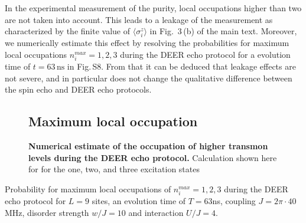 In the experimental measurement of the purity, local occupations higher than two are not taken into account. This leads to a leakage of the measurement as characterized by the finite value of $\langle \sigma^z_i\rangle$ in Fig. \,3\,(b) of the main text. Moreover, we numerically estimate this effect by resolving the probabilities for maximum local occupations $n_i^{max} = 1,2,3$ during the DEER echo protocol for a evolution time of $t = 63 \, \text{ns}$ in Fig.\,S8.
From that it can be deduced that leakage effects are not severe, and in particular does not change the qualitative difference between the spin echo and DEER echo protocols.
\begin{figure}
\subsection{Maximum local occupation}
\centering
{}
\caption{\textbf{Numerical estimate of the occupation of higher transmon levels during the DEER echo protocol.} Calculation shown here for for the one, two, and three excitation states}
\label{figLocalOcc}
\end{figure}
Probability for maximum local occupations of $n_i^{max} = 1,2,3$ during the DEER echo protocol for $L=9$ sites, an evolution time of $T=63$ns, coupling $J=2\pi \cdot 40$MHz, disorder strength $w/J=10$ and interaction $U/J=4$.

